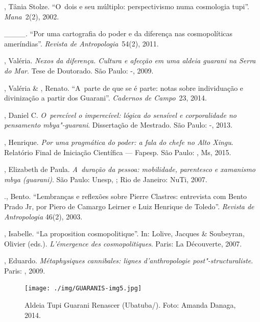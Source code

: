 \begin{Parskip}
, Tânia Stolze. ``O~dois e seu múltiplo: perspectivismo numa
cosmologia tupi''. \emph{Mana}~2(2), 2002.

\_\_\_\_. ``Por uma cartografia do poder e da diferença nas cosmopolíticas
ameríndias''. \emph{Revista de Antropologia}~54(2), 2011. 

, Valéria. \emph{Nexos da diferença. Cultura e afecção em uma aldeia
guarani na Serra do Mar}. Tese de Doutorado. São Paulo: -, 2009.

, Valéria \& , Renato. ``A~parte de que se é parte: notas
sobre individuação e divinização a partir dos Guarani''. \emph{Cadernos de
Campo}~23, 2014.

, Daniel C. \emph{O~perecível o imperecível: lógica do sensível e
corporalidade no pensamento mbya"-guarani}. Dissertação de Mestrado. São
Paulo: -, 2013.

, Henrique. \emph{Por uma pragmática do poder: a fala do chefe no Alto
Xingu}. Relatório Final de Iniciação Científica --- Fapesp. São Paulo:
, Ms, 2015. 

, Elizabeth de Paula. \emph{A~duração da pessoa: mobilidade,
parentesco e xamanismo mbya (guarani)}. São Paulo: Unesp, ; Rio de
Janeiro: NuTi, 2007.

 ., Bento. ``Lembranças e reflexões sobre Pierre Clastres:
entrevista com Bento Prado Jr, por Piero de Camargo Leirner e Luiz
Henrique de Toledo''. \emph{Revista de Antropologia} 46(2), 2003.

, Isabelle. ``La proposition cosmopolitique''. In: Lolive, Jacques
\& Soubeyran, Olivier (eds.). \emph{L’émergence des cosmopolitiques}. Paris:
La Découverte, 2007.

  , Eduardo. \emph{Métaphysiques cannibales: lignes
d’anthropologie post"-structuraliste}. Paris: , 2009.
\end{Parskip}

\clearpage
\thispagestyle{empty}

\movetoevenpage
\begin{absolutelynopagebreak}
\begin{vplace}
\begin{figure}[H]
\begin{adjustwidth}{-2.7cm}{}
 \vspace{-3.1cm}
 \texttt{[image: ./img/GUARANIS-img5.jpg]}	
  \hfill
  \end{adjustwidth}
  \caption{Aldeia Tupi Guarani Renascer (Ubatuba/). Foto: Amanda Danaga, 2014.}
\end{figure}
\end{vplace}

\thispagestyle{empty}
\end{absolutelynopagebreak}

